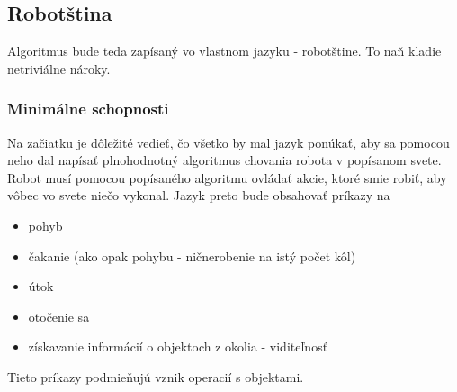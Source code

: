 \subsection{Robotština}
Algoritmus bude teda zapísaný vo vlastnom jazyku - robotštine. To naň kladie netriviálne nároky.
\subsubsection{Minimálne schopnosti}
Na začiatku je dôležité vedieť, čo všetko by mal jazyk ponúkať, aby sa pomocou neho dal napísať plnohodnotný algoritmus chovania robota v popísanom svete. \\
Robot musí pomocou popísaného algoritmu ovládať akcie, ktoré smie robiť, aby vôbec vo svete niečo vykonal. Jazyk preto bude obsahovať príkazy na 
\begin{itemize}
\item pohyb 
\item čakanie (ako opak pohybu - ničnerobenie na istý počet kôl)
\item útok
\item otočenie sa
\item získavanie informácií o objektoch z okolia - viditeľnosť
\end{itemize} %
Tieto príkazy podmieňujú vznik operacií s objektami.
